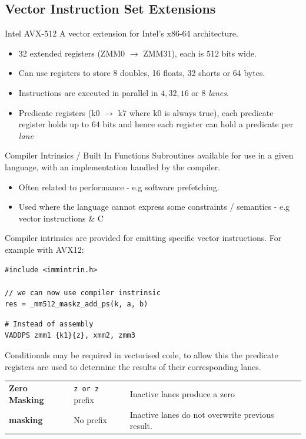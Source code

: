 \subsection{Vector Instruction Set Extensions}
\begin{definitionbox}{Intel AVX-512}
	A vector extension for Intel's x86-64 architecture.
	\begin{itemize}
		\item 32 extended registers (ZMM0 $\to$ ZMM31), each is $512$ bits wide.
		\item Can use registers to store 8 doubles, 16 floats, 32 shorts or 64 bytes.
		\item Instructions are executed in parallel in $4,32,16$ or $8$ \textit{lanes}.
		\item Predicate registers (k0 $\to$ k7 where k0 is always true), each predicate register holds up to $64$ bits and hence each register can hold a predicate per \textit{lane}
	\end{itemize}
\end{definitionbox}

\begin{definitionbox}{Compiler Intrinsics / Built In Functions}
	Subroutines available for use in a given language, with an implementation handled by the compiler.
	\begin{itemize}
		\item Often related to performance - e.g software prefetching.
		\item Used where the language cannot express some constraints / semantics - e.g vector instructions \& C
	\end{itemize}
\end{definitionbox}

Compiler intrinsics are provided for emitting specific vector instructions. For example with AVX12:
\begin{verbatim}
#include <immintrin.h>

// we can now use compiler instrinsic
res = _mm512_maskz_add_ps(k, a, b)
\end{verbatim}
\begin{verbatim}
# Instead of assembly
VADDPS zmm1 {k1}{z}, xmm2, zmm3
\end{verbatim}
Conditionals may be required in vectorised code, to allow this the predicate registers are used to determine the results of their corresponding lanes.
\begin{center}
	\begin{tabular}{l l p{}}
		\textbf{Zero Masking} & \texttt{z or {z}} prefix & Inactive lanes produce a zero                    \\
		\textbf{masking}      & No prefix                       & Inactive lanes do not overwrite previous result. \\
	\end{tabular}
\end{center}

